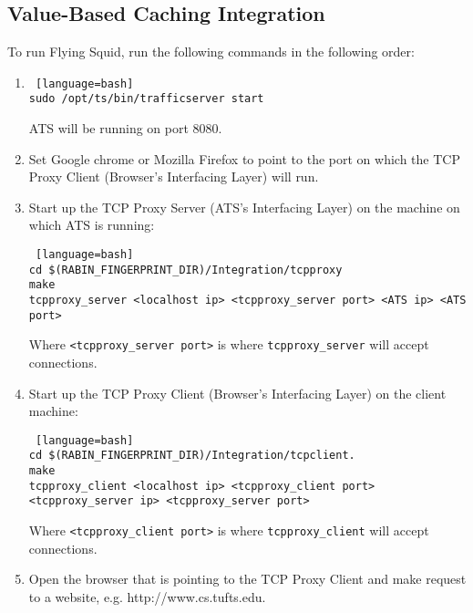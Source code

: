 \subsection{Value-Based Caching Integration}

To run Flying Squid, run the following commands in the following order:

\begin{enumerate}

\item 

\begin{lstlisting} [language=bash] 
sudo /opt/ts/bin/trafficserver start
\end{lstlisting}

ATS will be running on port 8080.

\item 

Set Google chrome or Mozilla Firefox to point to the port on which the TCP Proxy Client (Browser's Interfacing Layer) will run.

\item 

Start up the TCP Proxy Server (ATS's Interfacing Layer) on the machine on which ATS is running:

\begin{lstlisting} [language=bash] 
cd $(RABIN_FINGERPRINT_DIR)/Integration/tcpproxy
make
tcpproxy_server <localhost ip> <tcpproxy_server port> <ATS ip> <ATS port>
\end{lstlisting}

Where \verb|<tcpproxy_server port>| is where \verb|tcpproxy_server| will accept connections.

\item

Start up the TCP Proxy Client (Browser's Interfacing Layer) on the client machine:

\begin{lstlisting} [language=bash] 
cd $(RABIN_FINGERPRINT_DIR)/Integration/tcpclient.
make
tcpproxy_client <localhost ip> <tcpproxy_client port> <tcpproxy_server ip> <tcpproxy_server port>
\end{lstlisting}

Where \verb|<tcpproxy_client port>| is where \verb|tcpproxy_client| will accept connections.

\item

Open the browser that is pointing to the TCP Proxy Client and make request to a website, e.g. http://www.cs.tufts.edu.

\end{enumerate}

